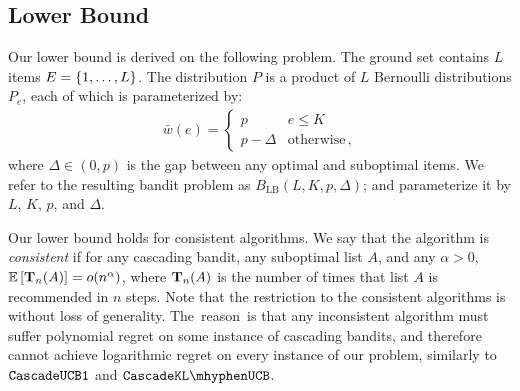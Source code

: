 
\subsection{Lower Bound}
\label{sec:lower bound}

Our lower bound is derived on the following problem. The ground set contains $L$ items $E = \left\{1, \dots, L\right\}$. The distribution $P$ is a product of $L$ Bernoulli distributions $P_e$, each of which is parameterized by:
\begin{align}
  \bar{w}(e) =
  \begin{cases}
    p & e \leq K \\
    p - \Delta & \text{otherwise}\,,
  \end{cases}
  \label{eq:attraction probability}
\end{align}
where $\Delta \in (0, p)$ is the gap between any optimal and suboptimal items. We refer to the resulting bandit problem as $B_\mathrm{LB}(L, K, p, \Delta)$; and parameterize it by $L$, $K$, $p$, and $\Delta$.

Our lower bound holds for consistent algorithms. We say that the algorithm is \emph{consistent} if for any cascading bandit, any suboptimal list $A$, and any $\alpha > 0$, $\mathbb{E} \left[\mathbf{T}_n(A)\right] = o(n^\alpha)$, where $\mathbf{T}_n(A)$ is the number of times that list $A$ is recommended in $n$ steps. Note that the restriction to the consistent algorithms is without loss of generality. \mbox{The reason is} that any inconsistent algorithm must suffer polynomial regret on some instance of cascading bandits, and therefore cannot achieve logarithmic regret on every instance of our problem, similarly to ${\tt CascadeUCB1}$ and $\cascadeklucb$.

